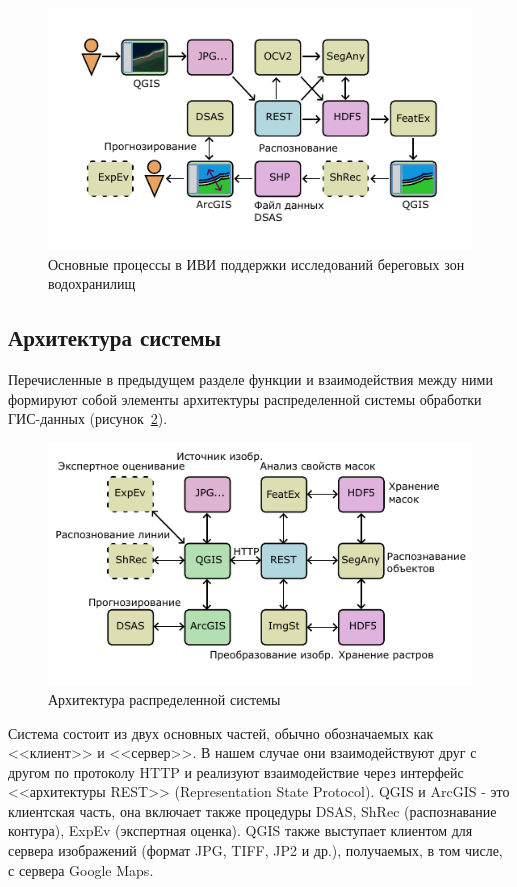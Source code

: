 \documentclass[732,fontsize=14pt,final]{studrep}
\begin{document}
  \begin{figure}[htp]
    \centering
    \includegraphics[width=\linewidth]{pics/tech.pdf}
    \caption{Основные процессы в ИВИ поддержки исследований береговых зон водохранилищ}\label{fig:processes}
  \end{figure}

\subsection{Архитектура системы}
Перечисленные в предыдущем разделе функции и взаимодействия между ними формируют собой элементы архитектуры распределенной системы обработки ГИС-данных (рисунок~\ref{fig:arch}).

\begin{figure}[htp]
\includegraphics[width=\linewidth]{pics/arch-p.pdf}
  \caption{Архитектура распределенной системы} \label{fig:arch}
\end{figure}

Система состоит из двух основных частей, обычно обозначаемых как <<клиент>> и <<сервер>>. В нашем случае они взаимодействуют друг с другом по протоколу HTTP и реализуют взаимодействие через интерфейс <<архитектуры REST>> (Representation State Protocol). QGIS и ArcGIS - это клиентская часть, она включает также процедуры DSAS, ShRec (распознавание контура), ExpEv (экспертная оценка). QGIS также выступает клиентом для сервера изображений (формат JPG, TIFF, JP2 и др.), получаемых, в том числе, с сервера Google Maps.
\end{document}
